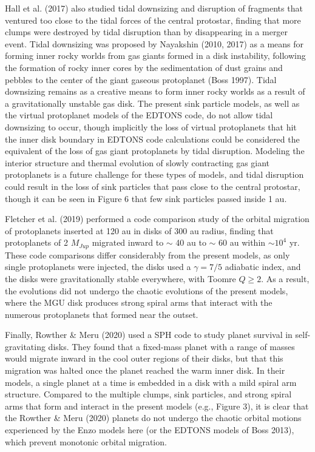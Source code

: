 \documentclass[12pt,preprint]{aastex}
\begin{document}
 Hall et al. (2017) also studied tidal downsizing and disruption of fragments that ventured too 
close to the tidal forces of the central protostar, finding that more clumps were destroyed by tidal
disruption than by disappearing in a merger event. Tidal downsizing was proposed by Nayakshin (2010,
2017) as a means for forming inner rocky worlds from gas giants formed in a disk instability,
following the formation of rocky inner cores by the sedimentation of dust grains and pebbles
to the center of the giant gaseous protoplanet (Boss 1997). Tidal downsizing remains as a creative
means to form inner rocky worlds as a result of a gravitationally unstable gas disk. The present
sink particle models, as well as the virtual protoplanet models  of the EDTONS code, do not allow
tidal downsizing to occur, though implicitly the loss of virtual protoplanets that hit the inner
disk boundary in EDTONS code calculations could be considered the equivalent of the loss of
gas giant protoplanets by tidal disruption. Modeling the interior structure and thermal evolution
of slowly contracting gas giant protoplanets is a future challenge for these types of models, and 
tidal disruption could result in the loss of sink particles that pass close to the central protostar, 
though it can be seen in Figure 6 that few sink particles passed inside 1 au.

 Fletcher et al. (2019) performed a code comparison study of the orbital migration of 
protoplanets inserted at 120 au in disks of 300 au radius, finding that protoplanets of 2 $M_{Jup}$  
migrated inward to $\sim$ 40 au to $\sim$ 60 au within $\sim 10^4$ yr. These code comparisons differ considerably from
the present models, as only single protoplanets were injected, the disks used a $\gamma = 7/5$ adiabatic
index, and the disks were gravitationally stable everywhere, with Toomre $Q \ge 2$. As a result, the
evolutions did not undergo the chaotic evolutions of the present models, where the MGU disk produces
strong spiral arms that interact with the numerous protoplanets that formed near the outset.

 Finally, Rowther \& Meru (2020) used a SPH code to study
planet survival in self-gravitating disks. They found that a fixed-mass planet with a range of
masses would migrate inward in the cool outer regions of their disks, but that this 
migration was halted once the planet reached the warm inner disk. In their models,
a single planet at a time is embedded in a disk with a mild spiral arm structure. Compared to
the multiple clumps, sink particles, and strong spiral arms that form and interact in the present 
models (e.g., Figure 3), it is clear that the Rowther \& Meru (2020) planets do not undergo
the chaotic orbital motions experienced by the Enzo models here (or the EDTONS models
of Boss 2013), which prevent monotonic orbital migration.
\end{document}
